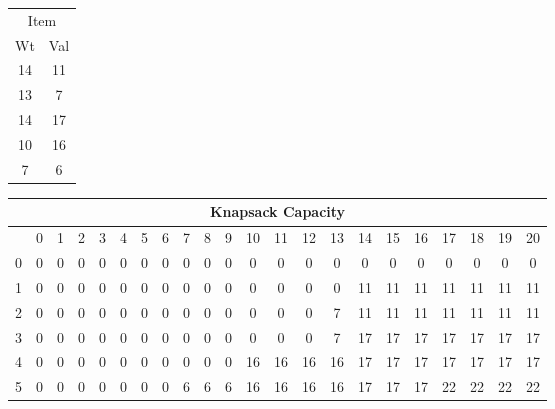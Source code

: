\documentclass[12pt]{article}
\begin{document}
\begin{tabular}{cc}
\\
\multicolumn{2}{c}{Item}\\
Wt & Val\\\hline
14 & 11 \\\hline
13 &7 \\\hline
14 & 17 \\\hline
10 & 16 \\\hline
7 & 6 \\\hline
\end{tabular}
\begin{tabular}{|c|c|c|c|c|c|c|c|c|c|c|c|c|c|c|c|c|c|c|c|c|c|}
\multicolumn{22}{c}{Knapsack Capacity}\\\hline
   &0 &1 &2 &3 &4 &5 &6 &7 &8 &9 &10 &11 &12 &13 &14 &15 &16 &17 &18 &19 &20\\\hline0 &0 &0 &0 &0 &0 &0 &0 &0 &0 &0 &0 &0 &0 &0 &0 &0 &0 &0 &0 &0 &0 \\\hline
1 &0 &0 &0 &0 &0 &0 &0 &0 &0 &0 &0 &0 &0 &0 &11 &11 &11 &11 &11 &11 &11 \\\hline
2 &0 &0 &0 &0 &0 &0 &0 &0 &0 &0 &0 &0 &0 &7 &11 &11 &11 &11 &11 &11 &11 \\\hline
3 &0 &0 &0 &0 &0 &0 &0 &0 &0 &0 &0 &0 &0 &7 &17 &17 &17 &17 &17 &17 &17 \\\hline
4 &0 &0 &0 &0 &0 &0 &0 &0 &0 &0 &16 &16 &16 &16 &17 &17 &17 &17 &17 &17 &17 \\\hline
5 &0 &0 &0 &0 &0 &0 &0 &6 &6 &6 &16 &16 &16 &16 &17 &17 &17 &22 &22 &22 &22 \\\hline

\end{tabular}
\end{document}
